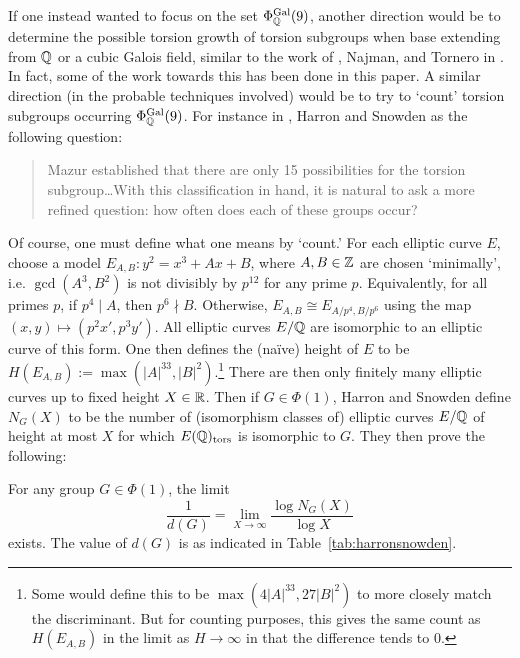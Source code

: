 If one instead wanted to focus on the set $\Phi_{\mathbb{Q}}^{\operatorname{Gal}}(9)$, another direction would be to determine the possible torsion growth of torsion subgroups when base extending from $\mathbb{Q}$ or a cubic Galois field, similar to the work of  \gonjim{}, Najman, and Tornero in \cite{gonjimnajmantornero16}. In fact, some of the work towards this has been done in this paper.  A similar direction (in the probable techniques involved) would be to try to `count' torsion subgroups occurring $\Phi_{\mathbb{Q}}^{\operatorname{Gal}}(9)$. For instance in \cite{harronsnowden17}, Harron and Snowden as the following question:
	\begin{quote}
	 Mazur established that there are only 15 possibilities for the torsion subgroup\dots With this classification in hand, it is natural to ask a more refined question: how often does each of these groups occur?
	\end{quote}
Of course, one must define what one means by `count.' For each elliptic curve $E$, choose a model $E_{A,B}: y^2= x^3 + Ax + B$, where $A,B \in \mathbb{Z}$ are chosen `minimally', i.e. $\gcd(A^3, B^2)$ is not divisibly by $p^{12}$ for any prime $p$. Equivalently, for all primes $p$, if $p^4 \mid A$, then $p^6 \nmid B$. Otherwise, $E_{A,B} \cong E_{A/p^4, B/p^6}$ using the map $(x,y) \mapsto (p^2x', p^3y')$. All elliptic curves $E/\mathbb{Q}$ are isomorphic to an elliptic curve of this form. One then defines the (na\"ive) height of $E$ to be $H(E_{A,B}):= \max(|A|^33, |B|^2)$.\footnote{Some would define this to be $\max(4|A|^33, 27|B|^2)$ to more closely match the discriminant. But for counting purposes, this gives the same count as $H(E_{A,B})$ in the limit as $H \to \infty$ in that the difference tends to 0.} There are then only finitely many elliptic curves up to fixed height $X \in \mathbb{R}$. Then if $G \in \Phi(1)$, Harron and Snowden define $N_G(X)$ to be the number of (isomorphism classes of) elliptic curves $E/\mathbb{Q}$ of height at most $X$ for which $E(\mathbb{Q})_{\text{tors}}$ is isomorphic to $G$. They then prove the following:


\begin{thm}
For any group $G \in \Phi(1)$, the limit
	\[
	\dfrac{1}{d(G)}= \lim_{X \to \infty} \dfrac{\log N_G(X)}{\log X}
	\]
exists. The value of $d(G)$ is as indicated in Table~\ref{tab:harronsnowden}.
\end{thm}


